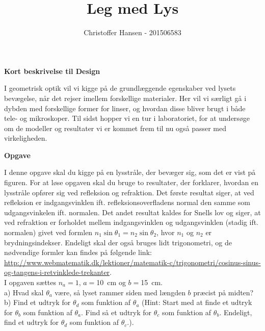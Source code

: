 \documentclass[a4paper,oneside,article]{memoir}
\begin{document}
\title{Leg med Lys}

\author{Christoffer Hansen - 201506583}

\maketitle

\begin{center}
	\textbf{Kort beskrivelse til Design}
\end{center}

I geometrisk optik vil vi kigge på de grundlæggende egenskaber ved lysets bevægelse, når det rejser imellem forskellige materialer. Her vil vi særligt gå i dybden med forskellige former for linser, og hvordan disse bliver brugt i både tele- og mikroskoper. Til sidst hopper vi en tur i laboratoriet, for at undersøge om de modeller og resultater vi er kommet frem til nu også passer med virkeligheden.

\begin{center}
	\textbf{Opgave}
\end{center}

I denne opgave skal du kigge på en lysstråle, der bevæger sig, som det er vist på figuren. For at løse opgaven skal du bruge to resultater, der forklarer, hvordan en lysstråle opfører sig ved refleksion og refraktion. Det første resultat siger, at ved refleksion er indgangsvinklen ift. refleksionsoverfladens normal den samme som udgangsvinkelen ift. normalen. Det andet resultat kaldes for Snells lov og siger, at ved refraktion er forholdet mellem indgangsvinklen og udgangsvinklen (stadig ift. normalen) givet ved formlen $n_1 \sin \theta_1 = n_2 \sin \theta_2$, hvor $n_1$ og $n_2$ er brydningsindekser. Endeligt skal der også bruges lidt trigonometri, og de nødvendige formler kan findes på følgende link: \url{http://www.webmatematik.dk/lektioner/matematik-c/trigonometri/cosinus-sinus-og-tangens-i-retvinklede-trekanter}.\\

I opgaven sættes $n_a = 1$, $a=$\SI[mode=text]{10}{\centi\meter} og $b=$\SI[mode=text]{15}{\centi\meter}.\\

a) Hvad skal $\theta_a$ være, så lyset rammer siden med længden $b$ præcist på midten?\\

b) Find et udtryk for $\theta_d$ som funktion af $\theta_a$ (Hint: Start med at finde et udtryk for $\theta_b$ som funktion af $\theta_a$. Find så et udtryk for $\theta_c$ som funktion af $\theta_b$. Endeligt, find et udtryk for $\theta_d$ som funktion af $\theta_c$.). \\
\end{document}
